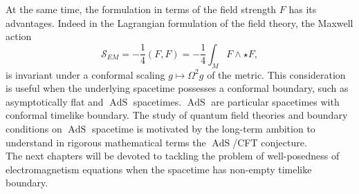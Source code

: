 At the same time, the formulation in terms of the field strength $F$ has its advantages. Indeed in the Lagrangian formulation of the field theory, the Maxwell action
\begin{equation}
\mathcal{S}_{EM}=-\frac14(F,F)=-\frac14\int_{M}F\wedge\star F,%
\end{equation}
is invariant under a conformal scaling $g\mapsto \Omega^2 g$ of the metric. This consideration is useful when the underlying spacetime possesses a conformal boundary, such as asymptotically flat and $\operatorname{AdS}$ spacetimes. $\operatorname{AdS}$ are particular spacetimes with conformal timelike boundary. The study of quantum field theories and boundary conditions on $\operatorname{AdS}$ spacetime is motivated by the long-term ambition to understand in rigorous mathematical terms the $\operatorname{AdS}$/CFT conjecture.\\





%
%
%
%
%
%
%
%
%
%
%
The next chapters will be devoted to tackling the problem of well-posedness of electromagnetism equations when the spacetime has non-empty timelike boundary.



